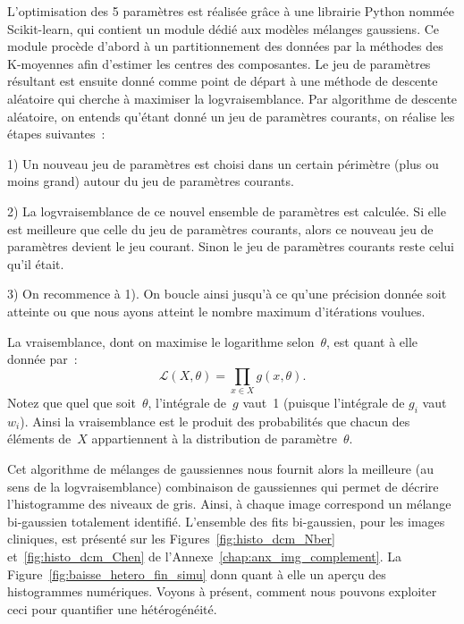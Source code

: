 \documentclass[main.tex]{subfiles}
\begin{document}
L'optimisation des 5 paramètres est réalisée grâce à une librairie Python nommée Scikit-learn, qui contient un module dédié aux modèles mélanges gaussiens. Ce module procède d'abord à un partitionnement %
des données par la méthodes des K-moyennes afin d'estimer les centres des composantes. Le jeu de paramètres résultant est ensuite donné comme point de départ à une méthode de descente aléatoire qui cherche à maximiser la logvraisemblance. Par algorithme de descente aléatoire, on entends qu'étant donné un jeu de paramètres courants, on réalise les étapes suivantes~:
\begin{myitemize}
\item[1)] Un nouveau jeu de paramètres est choisi dans un certain périmètre (plus ou moins grand) autour du jeu de paramètres courants.
\item[2)] La logvraisemblance de ce nouvel ensemble de paramètres est calculée. Si elle est meilleure que celle du jeu de paramètres courants, alors ce nouveau jeu de paramètres devient le jeu courant. Sinon le jeu de paramètres courants reste celui qu'il était.
\item[3)] On recommence à 1). On boucle ainsi jusqu'à ce qu'une précision donnée soit atteinte ou que nous ayons atteint le nombre maximum d'itérations voulues.
\end{myitemize}
La vraisemblance, dont on maximise le logarithme selon~$\theta$, est quant à elle donnée par~:
\begin{equation}
\mathcal{L}(X,\theta) = \prod_{x \in X} g(x,\theta).
\end{equation}
Notez que quel que soit~$\theta$, l'intégrale de~$g$ vaut~1 (puisque l'intégrale de $g_i$ vaut $w_i$). 
Ainsi la vraisemblance est le produit des probabilités que chacun des éléments de~$X$ appartiennent à la distribution de paramètre~$\theta$.


Cet algorithme de mélanges de gaussiennes nous fournit alors la meilleure  (au sens de la logvraisemblance) combinaison de gaussiennes qui permet de décrire l'histogramme des niveaux de gris. Ainsi, à chaque image correspond un mélange bi-gaussien totalement identifié. 
L'ensemble des fits bi-gaussien, pour les images cliniques, est présenté sur les Figures~\ref{fig:histo_dcm_Nber} et~\ref{fig:histo_dcm_Chen} de l'Annexe~\ref{chap:anx_img_complement}. La Figure~\ref{fig:baisse_hetero_fin_simu} donn quant à elle un aperçu des histogrammes numériques. Voyons à présent, comment nous pouvons exploiter ceci pour quantifier une hétérogénéité. 
\end{document}
